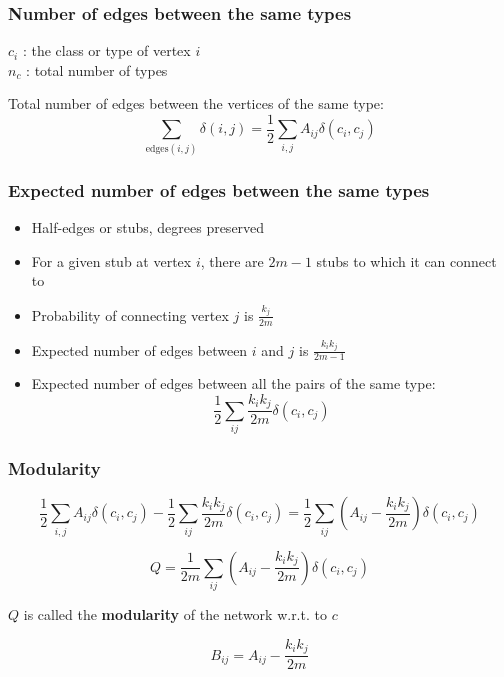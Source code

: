 \documentclass{beamer}
\begin{document}
\begin{frame}
    \frametitle{Number of edges between the same types}
        \begin{center}
        $c_i$ : the class or type of vertex $i$\\
        \vspace{2em}
        $n_c$ : total number of types
        \vspace{2em}

        Total number of edges between the vertices of the same type:
        $$\sum\limits_{\text{edges}(i,j)}\delta(i,j)=\frac{1}{2}\sum\limits_{i,j}A_{ij}\delta(c_i,c_j)$$ 
        \end{center}
\end{frame}
\begin{frame}
    \frametitle{Expected number of edges between the same types}
    \begin{itemize}
    \setlength\itemsep{1em}
        \item{Half-edges or stubs, degrees preserved}
        \item{For a given stub at vertex $i$, there are $2m-1$ stubs to which it can connect to}
        \item{Probability of connecting vertex $j$ is $\frac{k_j}{2m}$}
        \item{Expected number of edges between $i$ and $j$ is $\frac{k_ik_j}{2m-1}$}
        \item{Expected number of edges between all the pairs of the same type:
            $$\frac{1}{2}\sum\limits_{ij}\frac{k_ik_j}{2m}\delta(c_i,c_j)$$
}
    \end{itemize}
\end{frame}
\begin{frame}
    \frametitle{Modularity}
        $$\frac{1}{2}\sum\limits_{i,j}A_{ij}\delta(c_i,c_j)-\frac{1}{2}\sum\limits_{ij}\frac{k_ik_j}{2m}\delta(c_i,c_j)=\frac{1}{2}\sum\limits_{ij}\left(A_{ij}-\frac{k_ik_j}{2m}\right)\delta(c_i,c_j)$$ 

        \vspace{2em}
        \pause
        $$Q = \frac{1}{2m}\sum\limits_{ij}\left(A_{ij}-\frac{k_ik_j}{2m}\right)\delta(c_i,c_j)$$

        \vspace{2em}
        \centering
        $Q$ is called the {\bf modularity} of the network w.r.t. to $c$

        $$B_{ij}=A_{ij}-\frac{k_ik_j}{2m}$$
\end{frame}
\end{document}
